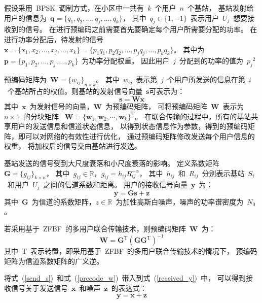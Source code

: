  假设采用~BPSK~调制方式，在小区中一共有~$k$~个用户~$n$~个基站，
 基站发射给用户的信息为~$\mathbf{q}=\{q_1,q_2,\dots,q_j,\dots,q_k\}$，
 其中~$q_j\in\{1,-1\}$~表示用户~$U_j$~想要接收到的信号。
 在进行预编码之前需要首先要确定每个用户所需要分配的功率。
 在进行功率分配后，待发射的信号~$\mathbf{x} = \{x_1,x_2,\dots,x_j,\dots,x_k\} = \{p_1 q_1,p_2 q_2,\dots,p_j q_j,\dots,p_k q_k\}$。
 其中为~$\mathbf{p}=\{p_1,p_2,\dots,p_j,\dots,p_k\}$~为功率分配权重。
 因此用户~$j$~分配到的功率的值为~${p_j}^2$~

 预编码矩阵为~${\mathbf{W}=\{w_{ij}\}}_{n\times k}$。
 其中~$w_{ij}$~表示第~$j$~个用户所发送的信息在第~$i$~个基站所占的权值。则基站的发射信号向量~$\mathbf{s}$可表示为：
 \begin{equation}\label{send_s}
   \mathbf{s}=\mathbf{W} \mathbf{x}
 \end{equation}
其中~$\mathbf{x}$~为发射信号的向量，$\mathbf{W}$~为预编码矩阵，
可将预编码矩阵~$\mathbf{W}$~表示为~$n\times 1$~的分块矩阵
~$\mathbf{W}=\{\mathbf{w}_1, \mathbf{w}_2,\cdots,\mathbf{w}_k\}^{\mathrm{T}}$。
在联合传输的过程中，所有的基站共享用户的发送信息和信道状态信息，
以得到状态信息作为参数，得到的预编码矩阵，即可以对网络的有效性进行优化，
通过预编码矩阵修改发送每个用户信息的权重，
将加权后的信号交由基站进行发送。

基站发送的信号受到大尺度衰落和小尺度衰落的影响。
定义系数矩阵~$\mathbf{G}=\{g_{ij}\}_{k\times n}$，
其中~$g_{ij}\in\mathbb{R}$，$g_{ij} = h_{ij}R_{ij}^{-\alpha}$，
其中~$h_{ij}$~和~$R_{ij}$~分别表示基站~$S_i$~和用户~$U_j$~之间的信道系数和距离。
用户的接收信号向量~$\mathbf{y}$~为：
\begin{equation}\label{received_y}
  \mathbf{y} = \mathbf{Gs} + \mathbf{z}
\end{equation}
其中~$\mathbf{G}$~为信道的系数矩阵，$z\in \mathbb{R}$~为加性高斯白噪声，噪声的功率谱密度为~$N_0$。

若采用基于~ZFBF~的多用户联合传输技术，则预编码矩阵~$\mathbf{W}$~为：
\begin{equation}\label{precode_w}
  \mathbf{W} = \mathbf{G}^{\mathrm{T}}(\mathbf{G}\mathbf{G}^{\mathrm{T}})^{-1}
\end{equation}
其中~$\mathrm{T}$~表示转置，即采用基于~ZFBF~的多用户联合传输技术的情况下，
预编码矩阵为信道系数矩阵的广义逆。

将式~(\ref{send_s})~和式~(\ref{precode_w})~带入到式~(\ref{received_y})~中，
可以得到接收信号关于发送信号~$\mathbf{x}$~和噪声~$\mathbf{z}$~的表达式：
\begin{equation}
  \mathbf{y} = \mathbf{x} + \mathbf{z}
\end{equation}

